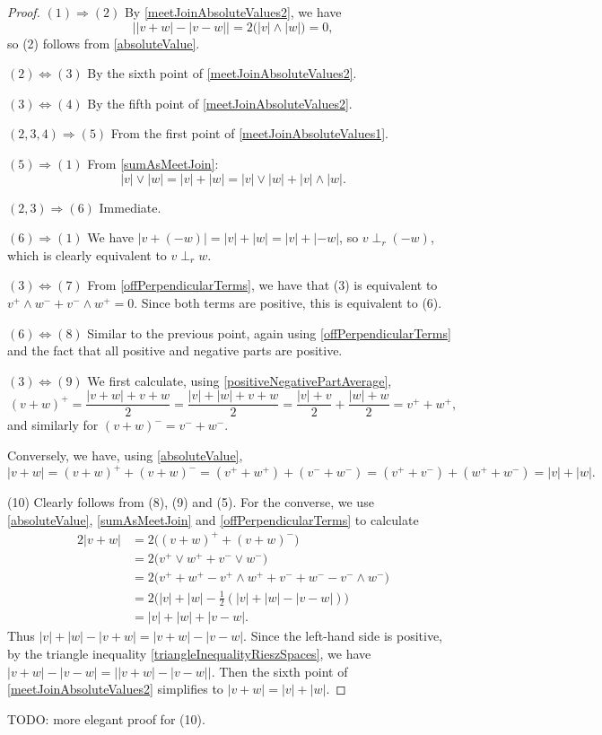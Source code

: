 \begin{proof}
$(1) \Rightarrow (2)$ By \ref{meetJoinAbsoluteValues2}, we have
\[ \big||v+w| - |v-w|\big| = 2\big(|v|\wedge |w|\big) = 0, \]
so (2) follows from \ref{absoluteValue}.

$(2) \Leftrightarrow (3)$ By the sixth point of \ref{meetJoinAbsoluteValues2}.

$(3) \Leftrightarrow (4)$ By the fifth point of \ref{meetJoinAbsoluteValues2}.

$(2,3,4) \Rightarrow (5)$ From the first point of \ref{meetJoinAbsoluteValues1}.

$(5) \Rightarrow (1)$ From \ref{sumAsMeetJoin}:
\[ |v|\vee |w| = |v|+ |w| = |v|\vee |w| + |v|\wedge |w|. \]

$(2,3) \Rightarrow (6)$ Immediate.

$(6) \Rightarrow (1)$ We have $|v+(-w)| = |v|+|w| = |v|+|-w|$, so $v\perp_r (-w)$, which is clearly equivalent to $v\perp_r w$.

$(3) \Leftrightarrow (7)$ From \ref{offPerpendicularTerms}, we have that (3) is equivalent to $v^+\wedge w^- + v^- \wedge w^+ = 0$. Since both terms are positive, this is equivalent to (6).

$(6) \Leftrightarrow (8)$ Similar to the previous point, again using \ref{offPerpendicularTerms} and the fact that all positive and negative parts are positive.

$(3) \Leftrightarrow (9)$ We first calculate, using \ref{positiveNegativePartAverage},
\[ (v+w)^+ = \frac{|v+w|+v+w}{2} = \frac{|v|+|w|+v+w}{2} = \frac{|v|+v}{2} + \frac{|w|+w}{2} = v^+ + w^+, \]
and similarly for $(v+w)^- = v^- + w^-$.

Conversely, we have, using \ref{absoluteValue},
\[ |v+w| = (v+w)^+ + (v+w)^- = (v^+ + w^+) + (v^- + w^-) = (v^+ + v^-) + (w^+ + w^-) = |v| + |w|. \]

(10) Clearly follows from (8), (9) and (5). For the converse, we use \ref{absoluteValue}, \ref{sumAsMeetJoin} and \ref{offPerpendicularTerms} to calculate
\begin{align*}
2|v+w| &= 2\big((v+w)^+ + (v+w)^-\big) \\
&= 2\big(v^+\vee w^+ + v^-\vee w^-\big) \\
&= 2\big(v^+ + w^+ - v^+\wedge w^+ + v^- + w^-  - v^-\wedge w^-\big) \\
&= 2\big(|v| + |w| - \frac{1}{2}(|v|+ |w| - |v-w|)\big) \\
&= |v|+|w| + |v-w|.
\end{align*}
Thus $|v|+ |w| - |v+w| = |v+w| - |v-w|$. Since the left-hand side is positive, by the triangle inequality \ref{triangleInequalityRieszSpaces}, we have $|v+w| - |v-w| = \big||v+w| - |v-w|\big|$. Then the sixth point of \ref{meetJoinAbsoluteValues2} simplifies to $|v+w| = |v| + |w|$.
\end{proof}
TODO: more elegant proof for (10).

